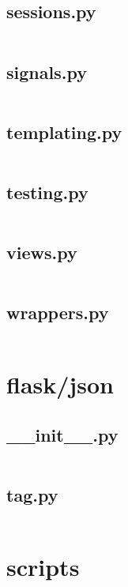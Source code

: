 \documentclass{article}
\begin{document}
\subsection{sessions.py}
\inputminted{python}{/tmp/flask/flask/sessions.py}
\newpage

\subsection{signals.py}
\inputminted{python}{/tmp/flask/flask/signals.py}
\newpage

\subsection{templating.py}
\inputminted{python}{/tmp/flask/flask/templating.py}
\newpage

\subsection{testing.py}
\inputminted{python}{/tmp/flask/flask/testing.py}
\newpage

\subsection{views.py}
\inputminted{python}{/tmp/flask/flask/views.py}
\newpage

\subsection{wrappers.py}
\inputminted{python}{/tmp/flask/flask/wrappers.py}
\newpage

\section{flask/json}

\subsection{\_\_init\_\_.py}
\inputminted{python}{/tmp/flask/flask/json/__init__.py}
\newpage

\subsection{tag.py}
\inputminted{python}{/tmp/flask/flask/json/tag.py}
\newpage

\section{scripts}
\end{document}
